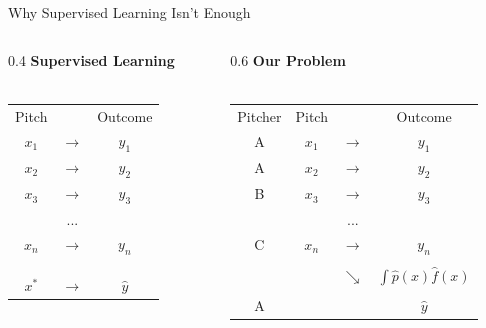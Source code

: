 \documentclass{beamer}
\begin{document}
  \begin{frame}{Why Supervised Learning Isn't Enough}
    \begin{columns}
      \begin{column}{0.4\columnwidth}
        \centering
        {\bf Supervised Learning}\\
        ~\\
        \begin{tabular}{ccc}
          Pitch &               & Outcome\\
          $x_1$ & $\rightarrow$ & $y_1$\\
          $x_2$ & $\rightarrow$ & $y_2$\\
          $x_3$ & $\rightarrow$ & $y_3$\\
                & ...           &      \\
          $x_n$ & $\rightarrow$ & $y_n$\\
          \\
          \\
          \\
          $x^*$ & $\rightarrow$ & $\hat y$\\
        \end{tabular}
      \end{column}
      \begin{column}{0.6\columnwidth}
        \centering
        {\bf Our Problem}\\
        ~\\
        \begin{tabular}{cccc}
          Pitcher & Pitch &               & Outcome\\
          A       & $x_1$ & $\rightarrow$ & $y_1$\\
          A       & $x_2$ & $\rightarrow$ & $y_2$\\
          B       & $x_3$ & $\rightarrow$ & $y_3$\\
                  &       & ...           &      \\
          C       & $x_n$ & $\rightarrow$ & $y_n$\\
                  & \\
                  &       & $\searrow$    & {\color{solarizedRebase03} $\int\hat p(x)\hat f(x)$}\\
                  & \\
          A       &       &               & $\hat y$\\
        \end{tabular}
      \end{column}
    \end{columns}
  \end{frame}
\end{document}
